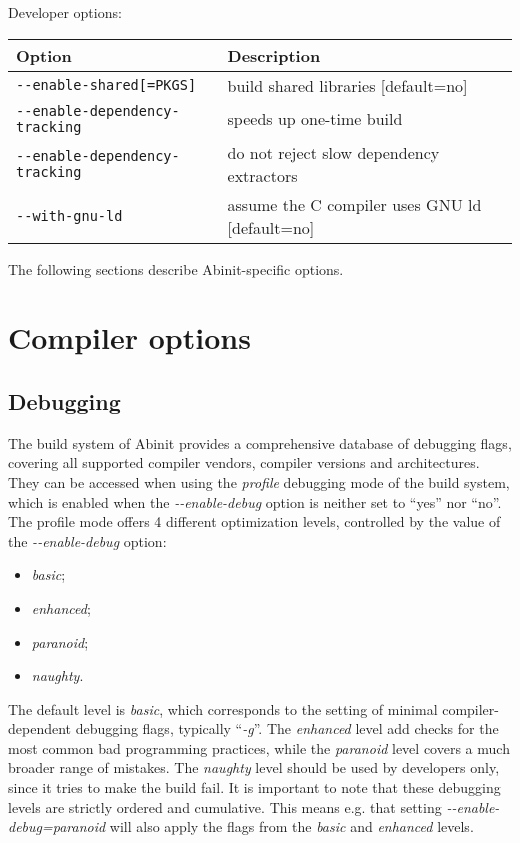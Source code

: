 Developer options:

\begin{center}
\begin{tabular}{|l|l|}
\hline 
\textbf{Option}  & \textbf{Description} \tabularnewline
\hline 
\texttt{-{-}enable-shared{[}=PKGS{]}}  & build shared libraries {[}default=no{]} \tabularnewline
\texttt{-{-}enable-dependency-tracking}  & speeds up one-time build \tabularnewline
\texttt{-{-}enable-dependency-tracking}  & do not reject slow dependency extractors \tabularnewline
\texttt{-{-}with-gnu-ld}  & assume the C compiler uses GNU ld {[}default=no{]} \tabularnewline
\hline
\end{tabular}
\par\end{center}

The following sections describe Abinit-specific options.


\section{Compiler options}


\subsection{Debugging}

The build system of Abinit provides a comprehensive database of debugging
flags, covering all supported compiler vendors, compiler versions
and architectures. They can be accessed when using the \textit{profile}
debugging mode of the build system, which is enabled when the \textit{\hbox{-{-}enable-debug}}
option is neither set to {}``yes'' nor {}``no''. The profile mode
offers 4 different optimization levels, controlled by the value of
the\textit{ \hbox{-{-}enable-debug}} option: 
\begin{itemize}
\item \textit{basic};
\item \textit{enhanced};
\item \textit{paranoid};
\item \textit{naughty}.
\end{itemize}
The default level is \textit{basic}, which corresponds to the setting
of minimal compiler-dependent debugging flags, typically {}``\textit{-g}''.
The \textit{enhanced} level add checks for the most common bad programming
practices, while the \textit{paranoid} level covers a much broader
range of mistakes. The \textit{naughty} level should be used by developers
only, since it tries to make the build fail. It is important to note
that these debugging levels are strictly ordered and cumulative. This
means e.g. that setting \textit{\hbox{-{-}enable-debug=paranoid}}
will also apply the flags from the \textit{basic} and \textit{enhanced}
levels.\\


